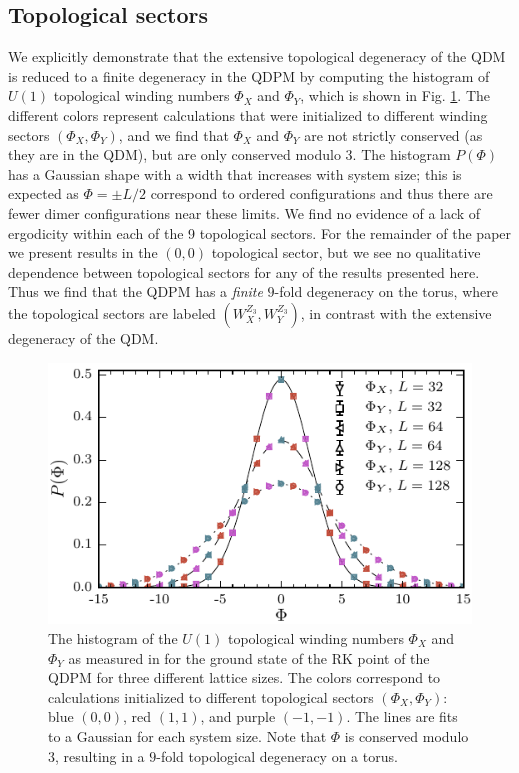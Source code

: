 \documentclass[twocolumn,prb,aps,floatfix,superscriptaddress]{revtex4-1}
\newcommand{\figref}[1]{Fig. \ref{#1}}
\begin{document}
\subsection{Topological sectors}

We explicitly demonstrate that the extensive topological degeneracy of the QDM is reduced to a finite degeneracy in the QDPM by computing the histogram of $U(1)$ topological winding numbers $\Phi_{X}$ and $\Phi_{Y}$, which is shown in \figref{fig:u1_wind_qdpm}. The different colors represent calculations that were initialized to different winding sectors $(\Phi_X,\Phi_Y)$, and we find that $\Phi_X$ and $\Phi_Y$ are not  strictly conserved (as they are in the QDM), but are only conserved modulo $3$. The histogram $P(\Phi)$ has a Gaussian shape with a width that increases with system size; this is expected as $\Phi = \pm L/2$ correspond to ordered configurations and thus there are fewer dimer configurations near these limits. We find no evidence of a lack of ergodicity within each of the 9 topological sectors. For the remainder of the paper we present results in the $(0,0)$ topological sector, but we see no qualitative dependence between topological sectors for any of the results presented here.  Thus we find that the QDPM has a \emph{finite} $9$-fold degeneracy on the torus, where the topological sectors are labeled $(W_X^{Z_3},W_Y^{Z_3})$, in contrast with the extensive degeneracy of the QDM.
\begin{figure}[]
    \centering
    \includegraphics[width=1.0\linewidth]{u1_wind_qdpm.pdf}
    \caption{The histogram of the $U(1)$ topological winding numbers $\Phi_X$ and $\Phi_Y$ as measured in for the ground state of the RK point of the QDPM for three different lattice sizes. The colors correspond to calculations initialized to different topological sectors $(\Phi_X,\Phi_Y)$: blue $(0,0)$, red $(1,1)$, and purple $(-1,-1)$. The lines are fits to a Gaussian for each system size. Note that $\Phi$ is conserved modulo $3$, resulting in a $9$-fold topological degeneracy on a torus.}
    \label{fig:u1_wind_qdpm}
\end{figure}
\end{document}
